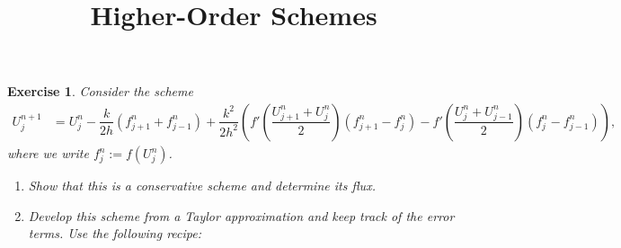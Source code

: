 \documentclass[10pt,letterpaper]{article}
\theoremstyle{break}
\newtheorem{exercise}{Exercise}
\begin{document}
\title{Higher-Order Schemes}
\date{}

\maketitle











\begin{exercise}
    Consider the scheme
    \begin{align}
     U^{n+1}_{j}
     &
     =
     U^{n  }_{j}
     -
     \dfrac{k}{2h}
     \left(
        f^{n}_{j+1} + f^{n}_{j-1}
     \right)
     +
     \dfrac{k^2}{2 h^2}
     \left(
        f'\left( \dfrac{ U^{n}_{j+1} + U^{n}_{j} }{2} \right)
        \left(
            f^{n}_{j+1} - f^{n}_{j}
        \right)
        -
        f'\left( \dfrac{ U^{n}_{j} + U^{n}_{j-1} }{2} \right)
        \left(
            f^{n}_{j} - f^{n}_{j-1}
        \right)
     \right)     
     ,
    \end{align}
    where we write $f^n_{j} := f\left( U^{n}_{j} \right)$. 
    \begin{enumerate}
        \item Show that this is a conservative scheme and determine its flux.
        \item Develop this scheme from a Taylor approximation and keep track of the error terms. Use the following recipe: 

\end{enumerate}
\end{exercise}
\end{document}
